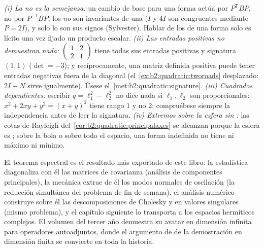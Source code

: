 \begin{remark}
\emph{(i) La  no es la semejanza:} un cambio de base
para una forma actúa por $P^{\mathsf T}BP$, no por $P^{-1}BP$; los
 \emph{no} son invariantes de una 
($I$ y $4I$ son congruentes mediante $P = 2I$), y solo lo son sus
signos (Sylvester). Hablar de los  de una forma solo
es lícito una vez fijado un producto escalar. \emph{(ii) Las
entradas positivas no demuestran nada:} $\begin{pmatrix} 1 & 2\\ 2 &
1\end{pmatrix}$ tiene todas sus entradas positivas y signatura
$(1,1)$ ($\det = -3$); y recíprocamente, una matriz definida
positiva puede tener entradas negativas fuera de la diagonal (el~\cref{ex:b2:quadratic:tworoads} desplazado: $2I - N$ sirve
igualmente). Úsese el~\cref{met:b2:quadratic:signature}.
\emph{(iii) Cuadrados dependientes:} escribir $q = \ell_1^2 -
\ell_2^2$ no dice nada si $\ell_1, \ell_2$ son proporcionales: $x^2
+ 2xy + y^2 = (x+y)^2$ tiene rango $1$ y no $2$; compruébese siempre
la independencia antes de leer la signatura. \emph{(iv) Extremos
sobre la esfera sin :} las cotas de Rayleigh del~\cref{cor:b2:quadratic:principalaxes} se alcanzan porque la esfera
es ; sobre la bola  o sobre todo el espacio, una
forma indefinida no tiene ni máximo ni mínimo.
\end{remark}

\begin{remark}
El teorema espectral es el resultado más exportado de este libro: la
estadística diagonaliza con él las matrices de covarianza (análisis
de componentes principales), la mecánica extrae de él los modos
normales de oscilación (la reducción simultánea del problema de fin
de semana), el análisis numérico construye sobre él las
descomposiciones de Cholesky y en valores singulares (mismo
problema), y el capítulo siguiente lo transporta a los espacios
hermíticos complejos. El volumen del tercer año demuestra su avatar
en dimensión infinita para operadores 
autoadjuntos, donde el argumento de  de la demostración
en dimensión finita se convierte en toda la historia.
\end{remark}

